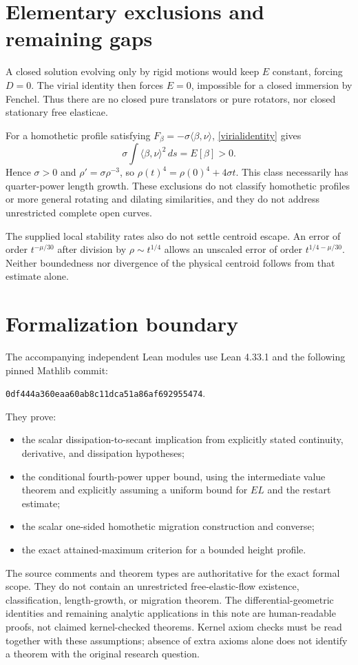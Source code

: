 \documentclass[11pt,a4paper]{article}
\begin{document}
\section{Elementary exclusions and remaining gaps}
A closed solution evolving only by rigid motions would keep $E$ constant, forcing $D=0$. The virial identity then forces $E=0$, impossible for a closed immersion by Fenchel. Thus there are no closed pure translators or pure rotators, nor closed stationary free elasticae.

For a homothetic profile satisfying $F_\beta=-\sigma\langle\beta,\nu\rangle$, \eqref{virialidentity} gives
\[
 \sigma\int\langle\beta,\nu\rangle^2\,ds=E[\beta]>0.
\]
Hence $\sigma>0$ and $\rho'=\sigma\rho^{-3}$, so $\rho(t)^4=\rho(0)^4+4\sigma t$. This class necessarily has quarter-power length growth. These exclusions do not classify homothetic profiles or more general rotating and dilating similarities, and they do not address unrestricted complete open curves.

The supplied local stability rates also do not settle centroid escape. An error of order $t^{-\mu/30}$ after division by $\rho\sim t^{1/4}$ allows an unscaled error of order $t^{1/4-\mu/30}$. Neither boundedness nor divergence of the physical centroid follows from that estimate alone.

\section{Formalization boundary}
The accompanying independent Lean modules use Lean 4.33.1 and the following pinned Mathlib commit:
\begin{center}\small\texttt{0df444a360eaa60ab8c11dca51a86af692955474}.\end{center}
They prove:
\begin{itemize}
\item the scalar dissipation-to-secant implication from explicitly stated continuity, derivative, and dissipation hypotheses;
\item the conditional fourth-power upper bound, using the intermediate value theorem and explicitly assuming a uniform bound for $EL$ and the restart estimate;
\item the scalar one-sided homothetic migration construction and converse;
\item the exact attained-maximum criterion for a bounded height profile.
\end{itemize}
The source comments and theorem types are authoritative for the exact formal scope. They do not contain an unrestricted free-elastic-flow existence, classification, length-growth, or migration theorem. The differential-geometric identities and remaining analytic applications in this note are human-readable proofs, not claimed kernel-checked theorems. Kernel axiom checks must be read together with these assumptions; absence of extra axioms alone does not identify a theorem with the original research question.
\end{document}
